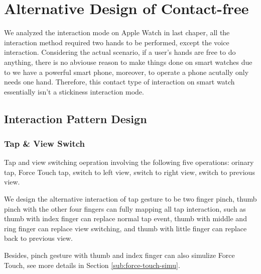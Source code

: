 \chapter{Alternative Design of Contact-free}

We analyzed the interaction mode on Apple Watch in last chaper, all the interaction method required two hands to be performed, except the voice interaction. Considering the actual scenario, if a user's hands are free to do anything, there is no abviouse reason to make things done on smart watches due to we have a powerful smart phone, moreover, to operate a phone acutally only needs one hand.
Therefore, this contact type of interaction on smart watch essentially isn't a stickiness interaction mode.

\section{Interaction Pattern Design}

\subsection{Tap \& View Switch}

Tap and view switching oepration involving the following five operations: orinary tap, Force Touch tap, switch to left view, switch to right view, switch to previous view.

We design the alternative interaction of tap gesture to be two finger pinch, thumb pinch with the other four fingers can fully mapping all tap interaction, such as thumb with index finger can replace normal tap event, thumb with middle and ring finger can replace view switching, and thumb with little finger can replace back to previous view.

Besides, pinch gesture with thumb and index finger can also simulize Force Touch, see more details in Section \ref{sub:force-touch-simu}.

